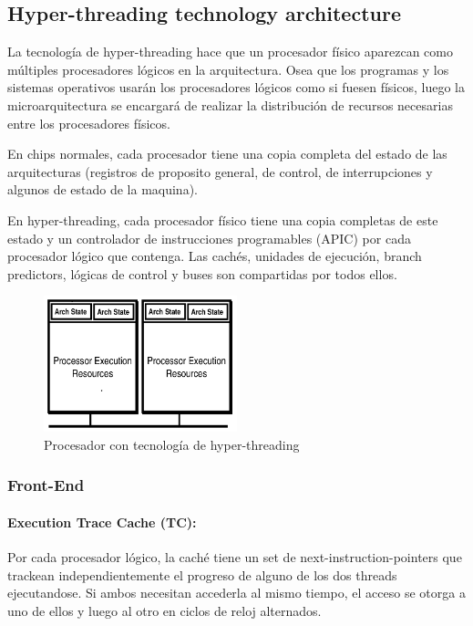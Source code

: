 \subsection{Hyper-threading technology architecture}

La tecnología de hyper-threading hace que un procesador físico aparezcan como múltiples procesadores lógicos en la arquitectura. Osea que los programas y los sistemas operativos usarán los procesadores lógicos como si fuesen físicos, luego la microarquitectura se encargará de realizar la distribución de recursos necesarias entre los procesadores físicos.

En chips normales, cada procesador tiene una copia completa del estado de las arquitecturas (registros de proposito general, de control, de interrupciones y algunos de estado de la maquina). 

En hyper-threading, cada procesador físico tiene una copia completas de este estado y un controlador de instrucciones programables (APIC) por cada procesador lógico que contenga.  Las cachés, unidades de ejecución, branch predictors, lógicas de control y buses son compartidas por todos ellos.

\begin{figure}[ht]
	\centering
	\includegraphics[width=0.5\textwidth]{imagenes/multithreading-procesor}
	\caption{Procesador con tecnología de hyper-threading}
	\label{fig:xenonHyperThreadingTechnology}
\end{figure}

\subsubsection{Front-End}
\paragraph{Execution Trace Cache (TC):}
Por cada procesador lógico, la caché tiene un set de next-instruction-pointers que trackean independientemente el progreso de alguno de los dos threads ejecutandose. Si ambos necesitan accederla al mismo tiempo, el acceso se otorga a uno de ellos y luego al otro en ciclos de reloj alternados.
	

